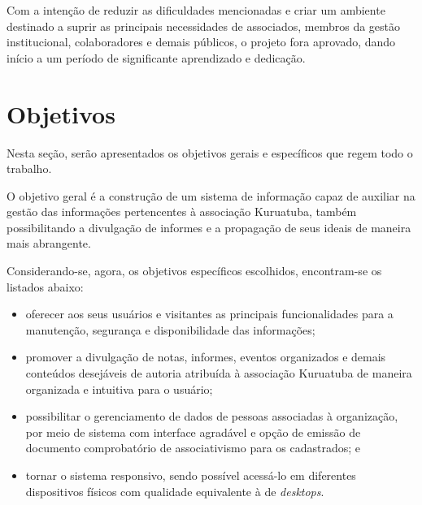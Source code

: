 Com a intenção de reduzir as dificuldades mencionadas e criar um ambiente destinado a suprir as principais necessidades de associados, membros da gestão institucional, colaboradores e demais públicos, o projeto fora aprovado, dando início a um período de significante aprendizado e dedicação.

\hspace{2.5cm}
\section{Objetivos}
\label{sec:telas}
\hspace{2.5cm}

Nesta seção, serão apresentados os objetivos gerais e específicos que regem todo o trabalho. 

O objetivo geral é a construção de um sistema de informação capaz de auxiliar na gestão das informações pertencentes à associação Kuruatuba, também possibilitando a divulgação de informes e a propagação de seus ideais de maneira mais abrangente.

Considerando-se, agora, os objetivos específicos escolhidos, encontram-se os listados abaixo:  
\begin{itemize}
 \item oferecer aos seus usuários e visitantes as principais funcionalidades para a manutenção, segurança e disponibilidade das informações;
 
 \item promover a divulgação de notas, informes, eventos organizados e demais conteúdos desejáveis de autoria atribuída à associação Kuruatuba de maneira organizada e intuitiva para o usuário;
  
 \item possibilitar o gerenciamento de dados de pessoas associadas à organização, por meio de sistema com interface agradável e opção de emissão de documento comprobatório de associativismo para os cadastrados; e
 
 \item tornar o sistema responsivo, sendo possível acessá-lo em diferentes dispositivos físicos com qualidade equivalente à de \textit{desktops}.
\end{itemize}



